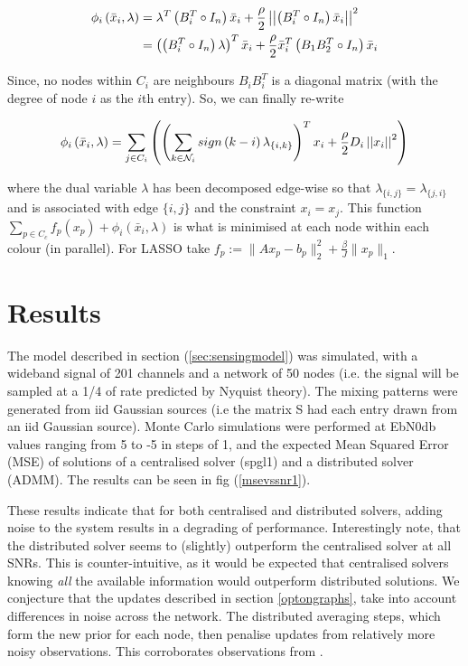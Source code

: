 \documentclass[conference]{IEEEtran}
\begin{document}
\begin{align*}
\phi_i\left(\bar{x}_i, \lambda\right) &= \lambda^T\left(B_i^T\circ I_n\right)\bar{x}_i + \frac{\rho}{2}\left|\left|\left(B_i^T\circ I_n\right)\bar{x}_i \right|\right|^2 \\
&= \left(\left(B_i^T\circ I_n\right)\lambda \right)^T\bar{x}_i + \frac{\rho}{2}\bar{x}_i^T\left(B_1B_2^T\circ I_n\right)\bar{x}_i
\end{align*}

Since, no nodes within \(C_i\) are neighbours \(B_iB_i^T\) is a diagonal matrix (with the degree of node \(i\) as the \(i\)th entry). So, we can finally re-write

\begin{equation*}
\phi_i\left(\bar{x}_i, \lambda\right) = \sum_{j \in C_i}\left(\left(\sum_{k \in \mathcal{N}_i} sign\left(k-i\right)\lambda_{\{i,k\}}\right)^T x_i + \frac{\rho}{2}D_i\left|\left|x_i\right|\right|^2  \right)
\end{equation*}

where the dual variable \(\lambda\) has been decomposed edge-wise so that \(\lambda_{\{i,j\}} = \lambda_{\{j,i\}}\) and is associated with edge \(\{i,j\}\) and the constraint \(x_i = x_j\). This function \(\sum_{p \in C_c} f_p\left(x_p\right) + \phi_i\left(\bar{x}_i, \lambda\right)\) is what is minimised at each node within each colour (in parallel). For LASSO take \(f_p := \|Ax_p-b_p\|_2^2 + \frac{\beta}{J}\|x_p\|_1 \).


\section{Results} \label{sec:results}

The model described in section (\ref{sec:sensingmodel}) was simulated, with a wideband signal of 201 channels and a network of 50 nodes (i.e. the signal will be sampled at a 1/4 of rate predicted by Nyquist theory). The mixing patterns were generated from iid Gaussian sources (i.e the matrix S had each entry drawn from an iid Gaussian source). Monte Carlo simulations were performed at EbN0db values ranging from 5 to -5 in steps of 1, and the expected Mean Squared Error (MSE) of solutions of a centralised solver (spgl1) and a distributed solver (ADMM). The results can be seen in fig (\ref{msevssnr1}). 

These results indicate that for both centralised and distributed solvers, adding noise to the system results in a degrading of performance. Interestingly note, that the distributed solver seems to (slightly) outperform the centralised solver at all SNRs. This is counter-intuitive, as it would be expected that centralised solvers knowing \textit{all} the available information would outperform distributed solutions. We conjecture that the updates described in section \ref{optongraphs}, take into account differences in noise across the network. The distributed averaging steps, which form the new prior for each node, then penalise updates from relatively more noisy observations. This corroborates observations from \cite{bazerque2008}.
\end{document}

